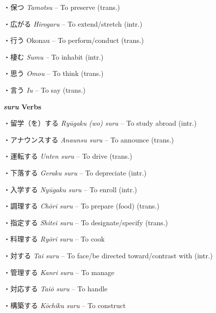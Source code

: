 \par{・保つ \emph{Tamotsu }– To preserve (trans.) }

\par{・広がる \emph{Hirogaru }– To extend\slash stretch (intr.) }

\par{・行う Okonau – To perform\slash conduct (trans.) }

\par{・棲む \emph{Sumu }– To inhabit (intr.) }

\par{・思う \emph{Omou }– To think (trans.) }

\par{・言う \emph{Iu }– To say (trans.) }

\par{\textbf{\emph{suru }Verbs }}

\par{・留学（を）する \emph{Ryūgaku (wo) suru }– To study abroad (intr.) }

\par{・アナウンスする \emph{Anaunsu suru }– To announce (trans.) }

\par{・運転する \emph{Unten suru }– To drive (trans.) }

\par{・下落する \emph{Geraku suru }– To depreciate (intr.) }

\par{・入学する \emph{Nyūgaku suru }– To enroll (intr.) }

\par{・調理する \emph{Chōri suru }– To prepare (food) (trans.) }

\par{・指定する \emph{Shitei suru }– To designate\slash specify (trans.) }

\par{・料理する \emph{Ryōri suru }– To cook }

\par{・対する \emph{Tai suru }– To face\slash be directed toward\slash contrast with (intr.) }

\par{・管理する \emph{Kanri suru }– To manage }

\par{・対応する \emph{Taiō suru }– To handle }

\par{・構築する \emph{Kōchiku suru }– To construct }

